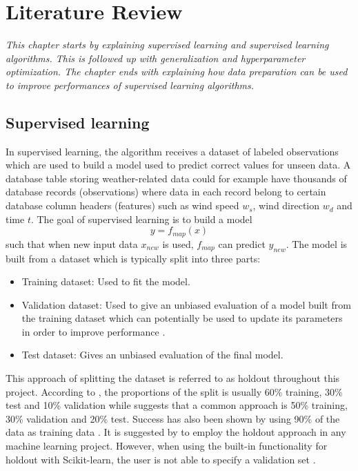 \chapter{Literature Review} \label {ch:theory}
\emph{This chapter starts by explaining supervised learning and supervised learning algorithms. This is followed up with generalization and hyperparameter optimization. The chapter ends with explaining how data preparation can be used to improve performances of supervised learning algorithms.}


\section{Supervised learning} \label{sec:supervisedlearning}
	In supervised learning, the algorithm receives a dataset of labeled observations which are used to build a model used to predict correct values for unseen data. A database table storing weather-related data could for example have thousands of database records (observations) where data in each record belong to certain database column headers (features) such as wind speed $w_s$, wind direction $w_d$ and time $t$. The goal of supervised learning is to build a model
\begin{equation} \label{eq:mappingfunction}
	y = f_{map}(x)
\end{equation}
such that when new input data $x_{new}$ is used, $f_{map}$ can predict $y_{new}$. The model is built from a dataset which is typically split into three parts:

\begin{itemize}
	\item {Training dataset:} Used to fit the model.
	\item {Validation dataset:} Used to give an unbiased evaluation of a model built from the training dataset which can potentially be used   to update its parameters in order to improve performance \cite{BOOK:6}.  %
	\item {Test dataset:} Gives an unbiased evaluation of the final model.
\end{itemize}
	This approach of splitting the dataset is referred to as holdout throughout this project.  According to \cite{BOOK:6}, the proportions of the split is usually 60\% training, 30\% test and 10\% validation while \cite{ARTICLE:4} suggests that a common approach is 50\% training, 30\% validation and 20\% test. Success has also been shown by using 90\% of the data as training data \cite{ARTICLE:19}. It is suggested by \cite{ARTICLE:4} to employ the holdout approach in any machine learning project. However, when using the built-in functionality for holdout with Scikit-learn, the user is not able to specify a validation set \cite{WEBSITE:34}. 

